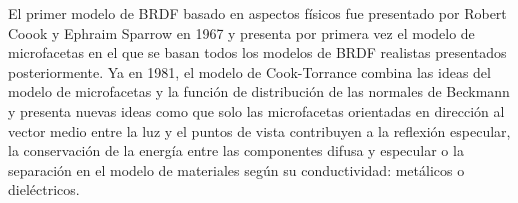 
El primer modelo de BRDF basado en aspectos f\'isicos fue presentado por Robert Coook y Ephraim Sparrow en 1967 \autocite{torrancesparrow}
y presenta por primera vez el modelo de microfacetas en el que se basan todos los modelos de BRDF realistas presentados posteriormente.
Ya en 1981, el modelo de Cook-Torrance \autocite{cooktorrance} combina las ideas del modelo de microfacetas y la funci\'on de distribuci\'on
de las normales de Beckmann \autocite{beckmann} y presenta nuevas ideas como que solo las microfacetas orientadas en direcci\'on al
vector medio entre la luz y el puntos de vista contribuyen a la reflexi\'on especular, la conservaci\'on de la energ\'ia entre las
componentes difusa y especular o la separaci\'on en el modelo de materiales seg\'un su conductividad: met\'alicos o diel\'ectricos.




